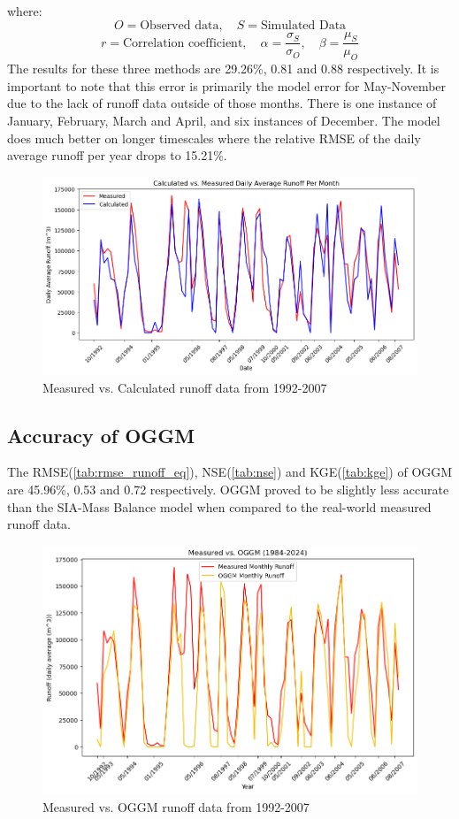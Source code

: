 \documentclass{article}
\begin{document}
\noindent where:
$$O = \text{Observed data}, \quad S=\text{Simulated Data}$$
$$r = \mbox{Correlation coefficient}, \quad \alpha = \frac{\sigma_S}{\sigma_O}, \quad \beta = \frac{\mu_S}{\mu_O}$$
The results for these three methods are 29.26\%, 0.81 and 0.88 respectively. It is important to note that this error is primarily the model error for 
May-November due to the lack of runoff data outside of those months. There is one instance of January, February, March and April, and six 
instances of December. The model does much better on longer timescales where the relative RMSE of the daily average runoff 
per year drops to 15.21\%.
\begin{figure}[h!]
    \centering
    \includegraphics[width=\textwidth]{Plots/calc_vs_measured.png}
    \caption{Measured vs. Calculated runoff data from 1992-2007}
    \label{fig:calc_vs_measured}
\end{figure}
\FloatBarrier
\subsection{Accuracy of OGGM}
The RMSE(\ref{tab:rmse_runoff_eq}), NSE(\ref{tab:nse}) and KGE(\ref{tab:kge}) of OGGM are 45.96\%, 0.53 and 0.72 respectively. OGGM proved to be slightly less accurate than the SIA-Mass Balance model when 
compared to the real-world measured runoff data. 
\begin{figure}[h!]
    \centering
    \includegraphics[width=\textwidth]{Plots/oggm_vs_measured.png}
    \caption{Measured vs. OGGM runoff data from 1992-2007}
    \label{fig:oggm_vs_measured}
\end{figure}
\FloatBarrier
\end{document}
